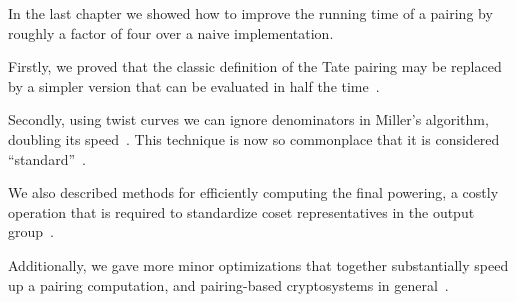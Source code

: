 In the last chapter we showed how to
improve the running time of a pairing
by roughly a factor of four over a naive implementation.

Firstly, we proved that the classic definition of the
Tate pairing may be replaced by a simpler version that
can be evaluated in half the time~\cite{bakls}.

Secondly, using twist curves we can ignore denominators
in Miller's algorithm, doubling its speed~\cite{bals2}.
This technique is now so commonplace that it is
considered ``standard''~\cite{hsv}.

We also described methods for efficiently computing
the final powering, a costly operation that is required
to standardize coset representatives in the output group~\cite{bakls}.

Additionally, we gave more minor optimizations that together
substantially speed up a pairing computation, and pairing-based cryptosystems
in general~\cite{bakls, bals2}.
